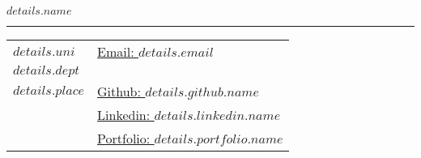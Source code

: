 \documentclass[letterpaper,11pt,oneside]{article}
\begin{document}
\noindent  \LARGE{\textbf{$details.name$}} \\
\vspace{-2ex} 
\hrule 
\normalsize

\begin{center}
\begin{tabular}{l l}
  $details.uni$   & \hspace{1in} \href{mailto:$details.email$}{Email: $details.email$} \\
  $details.dept$  & \hspace{1in}{Phone: $details.phone$} \\
  $details.place$ & \hspace{1in} \href{$details.github.url$}{Github: $details.github.name$} \\
  & \hspace{1in} \href{$details.linkedin.url$}{Linkedin: $details.linkedin.name$} \\
  & \hspace{1in} \href{$details.portfolio.url$}{Portfolio: $details.portfolio.name$}
\end{tabular}
\end{center}

\vspace{1em}

\end{document}
